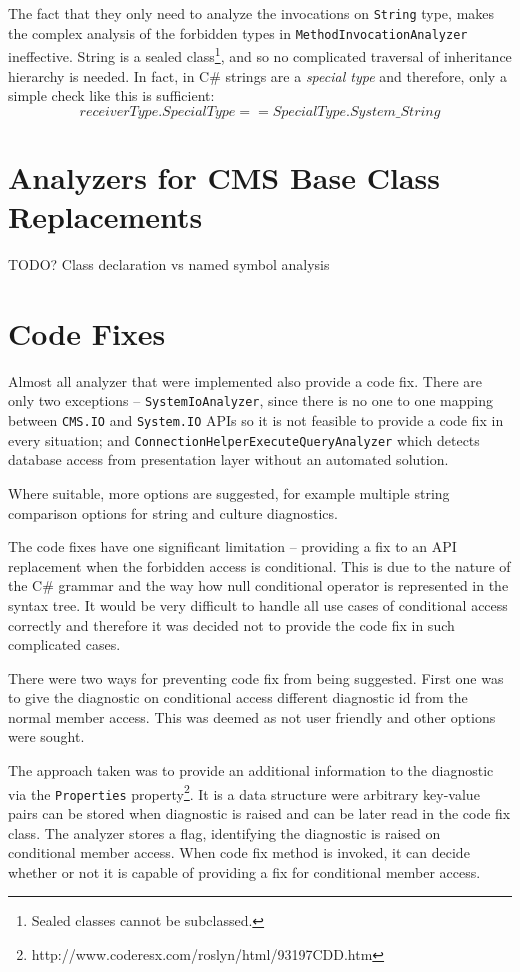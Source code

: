 \documentclass[
  digital, %
  table,   %
  lof,     %
  lot,     %
  oneside,
]{fithesis3}
\begin{document}
The fact that they only need to analyze the invocations on \texttt{String} type, makes the complex analysis of the forbidden types in \texttt{MethodInvocationAnalyzer} ineffective. String is a sealed class\footnote{Sealed classes cannot be subclassed.}, and so no complicated traversal of inheritance hierarchy is needed. In fact, in C\# strings are a \textit{special type} and therefore, only a simple check like this is sufficient:
$$
receiverType.SpecialType == SpecialType.System\_String
$$

\section{Analyzers for CMS Base Class Replacements}
TODO?
Class declaration vs named symbol analysis

\section{Code Fixes}
Almost all analyzer that were implemented also provide a code fix. There are only two exceptions -- \texttt{SystemIoAnalyzer}, since there is no one to one mapping between \texttt{CMS.IO} and \texttt{System.IO} APIs so it is not feasible to provide a code fix in every situation; and \texttt{ConnectionHelperExecuteQueryAnalyzer} which detects database access from presentation layer without an automated solution.

Where suitable, more options are suggested, for example multiple string comparison options for string and culture diagnostics. 

The code fixes have one significant limitation -- providing a fix to an API replacement when the forbidden access is conditional. This is due to the nature of the C\# grammar and the way how null conditional operator is represented in the syntax tree. It would be very difficult to handle all use cases of conditional access correctly and therefore it was decided not to provide the code fix in such complicated cases. 

There were two ways for preventing code fix from being suggested. First one was to give the diagnostic on conditional access different diagnostic id from the normal member access. This was deemed as not user friendly and other options were sought.

The approach taken was to provide an additional information to the diagnostic via the \texttt{Properties} property\footnote{http://www.coderesx.com/roslyn/html/93197CDD.htm}. It is a data structure were arbitrary key-value pairs can be stored when diagnostic is raised and can be later read in the code fix class. The analyzer stores a flag, identifying the diagnostic is raised on conditional member access. When code fix method is invoked, it can decide whether or not it is capable of providing a fix for conditional member access.
\end{document}
